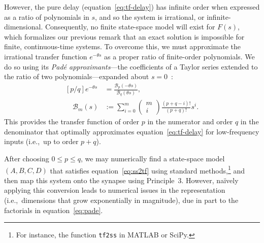 However, the pure delay (equation~\ref{eq:tf-delay}) has infinite order when expressed as a ratio of polynomials in $s$, and so the system is irrational, or infinite-dimensional.
Consequently, no finite state-space model will exist for $F(s)$, which formalizes our previous remark that an exact solution is impossible for finite, continuous-time systems.
To overcome this, we must approximate the irrational transfer function $e^{-\theta s}$ as a proper ratio of finite-order polynomials.
We do so using its \emph{Pad\'e approximants}---the coefficients of a Taylor series extended to the ratio of two polynomials---expanded about $s=0$~\citep{Pade1892, vajta2000some}:
\begin{equation} \label{eq:pade}
\begin{aligned}
\left[ p/q \right] e^{-\theta s} &= \frac{\mathcal{B}_{p}(-\theta s)}{\mathcal{B}_{q}(\theta s)} \text{,} \\
\quad \mathcal{B}_m(s) &:= \sum_{i=0}^m \begin{pmatrix}m \\ i\end{pmatrix} \frac{(p + q - i)!}{(p + q)!} s^i \text{.}
\end{aligned}
\end{equation}
This provides the transfer function of order $p$ in the numerator and order $q$ in the denominator that optimally approximates equation~\ref{eq:tf-delay} for low-frequency inputs (i.e.,~up to order $p + q$).

After choosing $0 \le p \le q$, we may numerically find a state-space model $(A\text{,}\, B\text{,}\, C\text{,}\, D)$ that satisfies equation~\ref{eq:ss2tf} using standard methods,\footnote{%
For instance, the function \texttt{tf2ss} in MATLAB or SciPy.}
and then map this system onto the synapse using Principle~3.
However, na\"ively applying this conversion leads to numerical issues in the representation (i.e.,~dimensions that grow exponentially in magnitude), due in part to the factorials in equation~\ref{eq:pade}.

